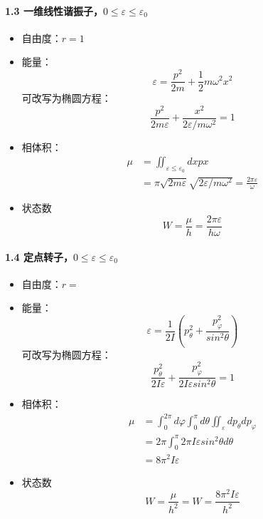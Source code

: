 \documentclass[UTF8,twocolumn]{ctexart}
\providecommand{\tightlist}{%
  \setlength{\itemsep}{0pt}\setlength{\parskip}{0pt}}
\let\oldparagraph\paragraph
\renewcommand{\paragraph}[1]{\oldparagraph{#1}\mbox{}}
\begin{document}
\paragraph{\texorpdfstring{1.3
一维线性谐振子，\(0\leq\varepsilon\leq\varepsilon_0\)}{1.3 一维线性谐振子，0\textbackslash{}leq\textbackslash{}varepsilon\textbackslash{}leq\textbackslash{}varepsilon\_0}}\label{ux4e00ux7ef4ux7ebfux6027ux8c10ux632fux5b500leqvarepsilonleqvarepsilon_0}

\begin{itemize}
\tightlist
\item
  自由度：\(r=1\)
\item
  能量： \[\varepsilon=\frac{p^2}{2m}+\frac{1}{2}m\omega^2x^2\]
  可改写为椭圆方程：
  \[\frac{p^2}{2m\varepsilon}+\frac{x^2}{2\varepsilon/m\omega^2}=1\]
\item
  相体积： \[\begin{aligned}
  \mu&=\iint_{\varepsilon\leq\varepsilon_0}dxpx\\
  &=\pi\sqrt{2m\varepsilon}\sqrt{2\varepsilon/m\omega^2}=\frac{2\pi\varepsilon}{\omega}
  \end{aligned}\]
\item
  状态数 \[W=\frac{\mu}{h}=\frac{2\pi\varepsilon}{h\omega}\]
\end{itemize}

\paragraph{\texorpdfstring{1.4
定点转子，\(0\leq\varepsilon\leq\varepsilon_0\)}{1.4 定点转子，0\textbackslash{}leq\textbackslash{}varepsilon\textbackslash{}leq\textbackslash{}varepsilon\_0}}\label{ux5b9aux70b9ux8f6cux5b500leqvarepsilonleqvarepsilon_0}

\begin{itemize}
\tightlist
\item
  自由度：\(r=\)
\item
  能量：
  \[\varepsilon=\frac{1}{2I}(p_{\theta}^2+\frac{p_{\varphi}^2}{sin^2\theta})\]
  可改写为椭圆方程：
  \[\frac{p_{\theta}^2}{2I\varepsilon}+\frac{p_{\varphi}^2}{2I\varepsilon sin^2\theta}=1\]
\item
  相体积： \[\begin{aligned}
  \mu&=\int_0^{2\pi}d\varphi\int_0^{\pi}d\theta\iint_{\varepsilon}dp_{\theta}dp_{\varphi}\\
  &=2\pi\int_0^{\pi}2\pi I\varepsilon sin^2\theta d\theta\\
  &=8\pi^2I\varepsilon
  \end{aligned}\]
\item
  状态数 \[W=\frac{\mu}{h^2}=W=\frac{8\pi^2I\varepsilon}{h^2}\]
\end{itemize}
\end{document}
